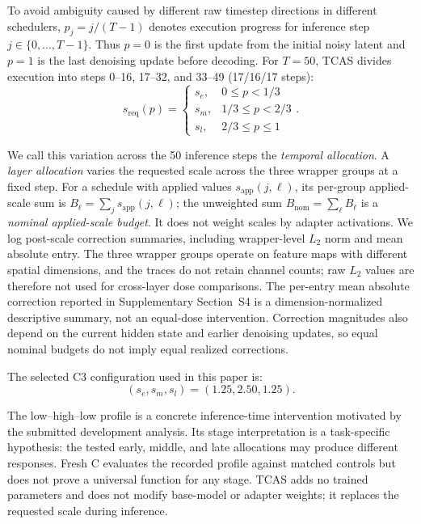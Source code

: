 \documentclass[times,twocolumn,final]{elsarticle}
\begin{document}
To avoid ambiguity caused by different raw timestep directions in different schedulers, $p_j=j/(T-1)$ denotes execution progress for inference step $j\in\{0,\ldots,T-1\}$. Thus $p=0$ is the first update from the initial noisy latent and $p=1$ is the last denoising update before decoding. For $T=50$, TCAS divides execution into steps 0--16, 17--32, and 33--49 (17/16/17 steps):
\begin{equation}
s_{\mathrm{req}}(p) = \begin{cases} s_e, & 0 \leq p < 1/3 \\ s_m, & 1/3 \leq p < 2/3 \\ s_l, & 2/3 \leq p \leq 1 \end{cases}.
\label{eq:tcas}
\end{equation}

We call this variation across the 50 inference steps the \emph{temporal allocation}. A \emph{layer allocation} varies the requested scale across the three wrapper groups at a fixed step. For a schedule with applied values $s_{\mathrm{app}}(j,\ell)$, its per-group applied-scale sum is $B_\ell=\sum_j s_{\mathrm{app}}(j,\ell)$; the unweighted sum $B_{\mathrm{nom}}=\sum_\ell B_\ell$ is a \emph{nominal applied-scale budget}. It does not weight scales by adapter activations. We log post-scale correction summaries, including wrapper-level $L_2$ norm and mean absolute entry. The three wrapper groups operate on feature maps with different spatial dimensions, and the traces do not retain channel counts; raw $L_2$ values are therefore not used for cross-layer dose comparisons. The per-entry mean absolute correction reported in Supplementary Section~S4 is a dimension-normalized descriptive summary, not an equal-dose intervention. Correction magnitudes also depend on the current hidden state and earlier denoising updates, so equal nominal budgets do not imply equal realized corrections.

The selected C3 configuration used in this paper is:
\begin{equation}
(s_e, s_m, s_l) = (1.25, 2.50, 1.25).
\end{equation}

The low--high--low profile is a concrete inference-time intervention motivated by the submitted development analysis. Its stage interpretation is a task-specific hypothesis: the tested early, middle, and late allocations may produce different responses. Fresh C evaluates the recorded profile against matched controls but does not prove a universal function for any stage. TCAS adds no trained parameters and does not modify base-model or adapter weights; it replaces the requested scale during inference.
\end{document}

